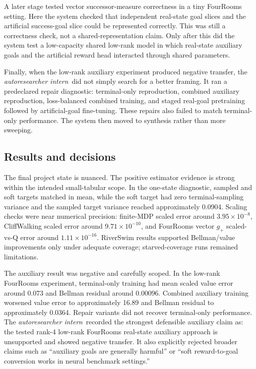 \documentclass{article}
\newcommand{\intern}{\emph{autoresearcher intern}}
\begin{document}
A later stage tested vector successor-measure correctness in a tiny FourRooms setting. Here the system checked that independent real-state goal slices and the artificial success-goal slice could be represented correctly. This was still a correctness check, not a shared-representation claim. Only after this did the system test a low-capacity shared low-rank model in which real-state auxiliary goals and the artificial reward head interacted through shared parameters.

Finally, when the low-rank auxiliary experiment produced negative transfer, the \intern\ did not simply search for a better framing. It ran a predeclared repair diagnostic: terminal-only reproduction, combined auxiliary reproduction, loss-balanced combined training, and staged real-goal pretraining followed by artificial-goal fine-tuning. These repairs also failed to match terminal-only performance. The system then moved to synthesis rather than more sweeping.

\subsection{Results and decisions}

The final project state is nuanced. The positive estimator evidence is strong within the intended small-tabular scope. In the one-state diagnostic, sampled and soft targets matched in mean, while the soft target had zero terminal-sampling variance and the sampled target variance reached approximately 0.0904. Scaling checks were near numerical precision: finite-MDP scaled error around \(3.95\times 10^{-8}\), CliffWalking scaled error around \(9.71\times 10^{-10}\), and FourRooms vector \(g_+\) scaled-vs-Q error around \(1.11\times 10^{-16}\). RiverSwim results supported Bellman/value improvements only under adequate coverage; starved-coverage runs remained limitations.

The auxiliary result was negative and carefully scoped. In the low-rank FourRooms experiment, terminal-only training had mean scaled value error around 0.073 and Bellman residual around 0.00096. Combined auxiliary training worsened value error to approximately 16.89 and Bellman residual to approximately 0.0364. Repair variants did not recover terminal-only performance. The \intern\ recorded the strongest defensible auxiliary claim as: the tested rank-4 low-rank FourRooms real-state auxiliary approach is unsupported and showed negative transfer. It also explicitly rejected broader claims such as ``auxiliary goals are generally harmful'' or ``soft reward-to-goal conversion works in neural benchmark settings.''
\end{document}
